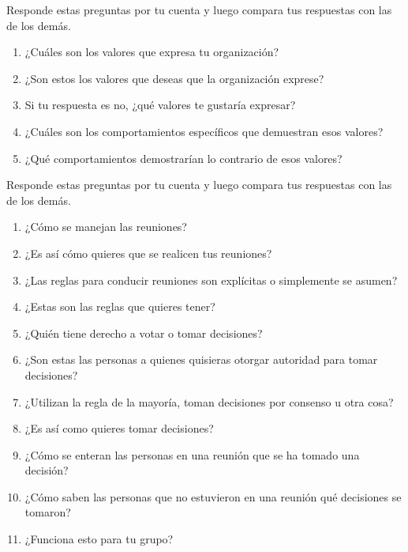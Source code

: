 
Responde estas preguntas por tu cuenta y
luego compara tus respuestas con las de los demás.

\begin{enumerate}

\item
  ¿Cuáles son los valores que expresa tu organización?

\item
  ¿Son estos los valores que deseas que la organización exprese?

\item
  Si tu respuesta es no, ¿qué valores te gustaría expresar?

\item
  ¿Cuáles son los comportamientos específicos que demuestran esos valores?

\item
  ¿Qué comportamientos demostrarían lo contrario de esos valores?
\end{enumerate}


Responde estas preguntas por tu cuenta y
luego compara tus respuestas con las de los demás.

\begin{enumerate}

\item
  ¿Cómo se manejan las reuniones?

\item
  ¿Es así cómo quieres que se realicen tus reuniones?

\item
  ¿Las reglas para conducir reuniones son explícitas o simplemente se asumen?

\item
  ¿Estas son las reglas que quieres tener?

\item
  ¿Quién tiene derecho a votar o tomar decisiones?

\item
  ¿Son estas las personas a quienes quisieras otorgar autoridad para tomar decisiones?

\item
  ¿Utilizan la regla de la mayoría, toman decisiones por consenso u otra cosa?

\item
  ¿Es así como quieres tomar decisiones?

\item
  ¿Cómo se enteran las personas en una reunión que se ha tomado una decisión?

\item
  ¿Cómo saben las personas que no estuvieron en una reunión qué decisiones se tomaron?

\item
  ¿Funciona esto para tu grupo?

\end{enumerate}

